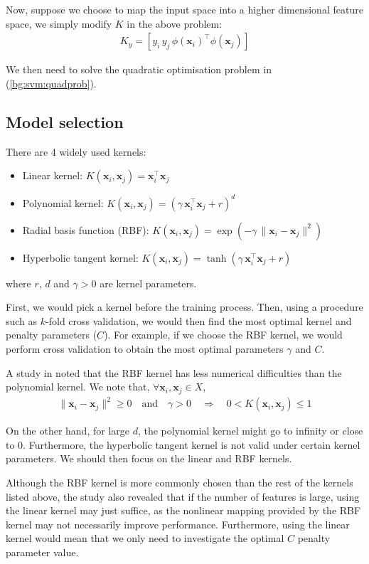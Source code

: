 \documentclass[12pt, twoside, a4paper]{report}
\def\vec{\boldsymbol}
\begin{document}
Now, suppose we choose to map the input space into a higher dimensional feature space, we simply modify $K$ in the above problem:
\begin{align*}
K_y = [y_i \, y_j \, \phi(\vec{x}_i)^\top \phi(\vec{x}_j)]
\end{align*}

We then need to solve the quadratic optimisation problem in (\ref{bg:svm:quadprob}).

\subsection{Model selection} \label{bg:ml:svm:model}
There are 4 widely used kernels:
\begin{itemize}
\item Linear kernel: $K(\vec{x}_i, \vec{x}_j) = \vec{x}_i^\top \vec{x}_j$
\item Polynomial kernel: $K(\vec{x}_i, \vec{x}_j) = (\gamma \, \vec{x}_i^\top \vec{x}_j + r)^d$
\item Radial basis function (RBF): $K(\vec{x}_i, \vec{x}_j) = \exp(-\gamma \, \| \vec{x}_i - \vec{x}_j \|^2)$
\item Hyperbolic tangent kernel: $K(\vec{x}_i, \vec{x}_j) = \tanh(\gamma \, \vec{x}_i^\top \vec{x}_j + r)$
\end{itemize}
where $r$, $d$ and $\gamma>0$ are kernel parameters.

First, we would pick a kernel before the training process. Then, using a procedure such as $k$-fold cross validation, we would then find the most optimal kernel and penalty parameters ($C$). For example, if we choose the RBF kernel, we would  perform cross validation to obtain the most optimal parameters $\gamma$ and $C$.

A study in \cite{RefWorks:128} noted that the RBF kernel has less numerical difficulties than the polynomial kernel. We note that, $\forall \vec{x}_i, \vec{x}_j \in X$,
\begin{align*}
\| \vec{x}_i - \vec{x}_j \|^2 \geq 0 \quad \text{and} \quad \gamma > 0 \quad \Rightarrow \quad 0 < K(\vec{x}_i, \vec{x}_j) \leq 1 
\end{align*}

On the other hand, for large $d$, the polynomial kernel might go to infinity or close to 0. Furthermore, the hyperbolic tangent kernel is not valid under certain kernel parameters. We should then focus on the linear and RBF kernels.

Although the RBF kernel is more commonly chosen than the rest of the kernels listed above, the study also revealed that if the number of features is large, using the linear kernel may just suffice, as the nonlinear mapping provided by the RBF kernel may not necessarily improve performance. Furthermore, using the linear kernel would mean that we only need to investigate the optimal $C$ penalty parameter value.
\end{document}
